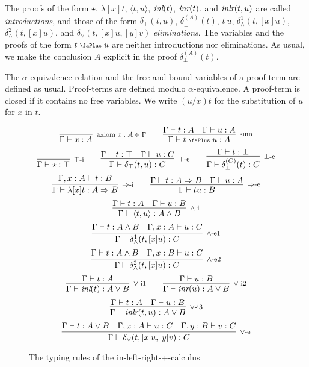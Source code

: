 \documentclass[screen, sigconf,authorversion,nonacm]{acmart}
\theoremstyle{acmdefinition}
\numberwithin{equation}{section}
\newcommand\irule[3]{\infer[\mbox{\footnotesize $#3$}]{#2}{#1}}
\newcommand\abstr[1]{[#1]}
\newcommand\inl{\mbox{\it inl}}
\newcommand\inr{\mbox{\it inr}}
\newcommand\inlr{\mbox{\it inlr}}
\newcommand\elimtop{\delta_{\top}}
\newcommand\elimbot[1]{\delta^{(#1)}_{\bot}}
\newcommand\elimand{\delta_{\wedge}}
\newcommand\elimor{\delta_{\vee}}
\newcommand\plus{\mathrel{\text{\normalfont\scalebox{0.7}{\faPlus}}}}
\newcommand\pair[2]{\langle #1, #2 \rangle}
\begin{document}
The proofs of the form $\star$, $\lambda \abstr{x}t$, $\pair{t}{u}$,
$\inl(t)$, $\inr(t)$, and $\inlr(t,u)$ are called {\it introductions},
and those of the form $\elimtop(t,u)$, $\elimbot{A}(t)$, $t~u$,
$\elimand^1(t,\abstr{x}u)$, $\elimand^2(t,\abstr{x}u)$, and
$\elimor(t,\abstr{x}u,\abstr{y}v)$ {\it eliminations}.  The variables
and the proofs of the form $t \plus u$ are neither introductions nor
eliminations. As usual, we make the conclusion $A$ explicit in the
proof $\elimbot A(t)$.

The $\alpha$-equivalence relation and the free and bound variables of
a proof-term are defined as usual. Proof-terms are defined modulo
$\alpha$-equivalence.  A proof-term is closed if it contains no free
variables.  We write $(u/x)t$ for the substitution of $u$ for $x$ in
$t$.

\begin{figure}[t]
  $$\irule{}
  {\Gamma \vdash x:A}
  {\mbox{axiom~$x:A \in \Gamma$}}
  \qquad
  \irule{\Gamma \vdash t:A & \Gamma \vdash u:A}
  {\Gamma \vdash t \plus u:A}
  {\mbox{sum}}$$
  $$\irule{}
  {\Gamma \vdash \star:\top}
  {\mbox{$\top$-i}}
  \qquad
  \irule{\Gamma \vdash t:\top & \Gamma \vdash u:C}
  {\Gamma \vdash \elimtop(t,u):C}
  {\mbox{$\top$-e}}
  \qquad
  \irule{\Gamma \vdash t:\bot}
  {\Gamma \vdash \elimbot{C}(t):C}
  {\mbox{$\bot$-e}}
  $$
  $$\irule{\Gamma, x:A \vdash t:B}
  {\Gamma \vdash \lambda \abstr{x}t:A \Rightarrow B}
  {\mbox{$\Rightarrow$-i}}
  \qquad
  \irule{\Gamma \vdash t:A\Rightarrow B & \Gamma \vdash u:A}
  {\Gamma \vdash t u:B}
  {\mbox{$\Rightarrow$-e}}$$
  $$\irule{\Gamma \vdash t:A & \Gamma \vdash u:B}
  {\Gamma \vdash \pair{t}{u}:A \wedge B}
  {\mbox{$\wedge$-i}}$$
  $$\irule{\Gamma \vdash t:A \wedge B & \Gamma, x:A \vdash u:C}
  {\Gamma \vdash \elimand^1(t,\abstr{x}u):C}
  {\mbox{$\wedge$-e1}}$$
  $$\irule{\Gamma \vdash t:A \wedge B & \Gamma, x:B \vdash u:C}
  {\Gamma \vdash \elimand^2(t,\abstr{x}u):C}
  {\mbox{$\wedge$-e2}}$$
$$
\irule{\Gamma \vdash t:A}
  {\Gamma \vdash \inl(t):A \vee B}
  {\mbox{$\vee$-i1}}
\qquad
\irule{\Gamma \vdash u:B}
  {\Gamma \vdash \inr(u):A \vee B}
  {\mbox{$\vee$-i2}}
  $$
  $$
\irule{\Gamma \vdash t:A & \Gamma \vdash u:B}
  {\Gamma \vdash \inlr(t,u):A \vee B}
  {\mbox{$\vee$-i3}}
  $$
$$\irule{\Gamma \vdash t:A \vee B & \Gamma, x:A \vdash u:C & \Gamma, y:B \vdash v:C}
  {\Gamma \vdash \elimor(t,\abstr{x}u,\abstr{y}v):C}
  {\mbox{$\vee$-e}}$$
  \caption{The typing rules of the in-left-right-+-calculus\label{figtypingrules}}
\end{figure}
\end{document}
